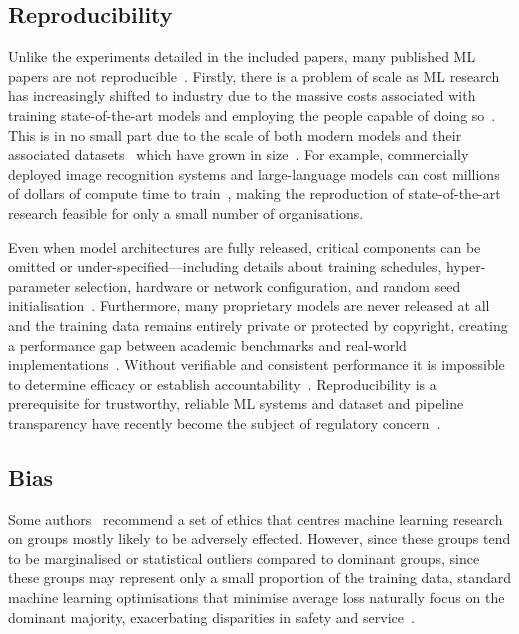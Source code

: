 \subsection{Reproducibility}
\label{subsec:reproducibility}

Unlike the experiments detailed in the included papers, many published ML papers are not reproducible~\cite{gundersen_reproducible,hutson2018reproduce,ciobanu2024reproducible,gundersen2022reproduce,medical_reproducibility}.
Firstly, there is a problem of scale as ML research has increasingly shifted to industry due to the massive costs associated with training state-of-the-art models and employing the people capable of doing so~\cite{ahmed2023growing,jurowetzki2021privatization}. 
This is in no small part due to the scale of both modern models and their associated datasets~\cite{desislavov2021compute,ai_power} which have grown in size~\cite{desislavov2021compute}.
For example, commercially deployed image recognition systems and large-language models can cost millions of dollars of compute time to train~\cite{ai_cost_comparison}, making the reproduction of state-of-the-art research feasible for only a small number of organisations. 

Even when model architectures are fully released, critical components can be omitted or under-specified---including details about training schedules, hyper-parameter selection, hardware or network configuration, and random seed initialisation~\cite{hutson2018reproduce,ciobanu2024reproducible,gundersen2022reproduce,medical_reproducibility,gundersen_reproducible}.
Furthermore, many proprietary models are never released at all and the training data remains entirely private or protected by copyright, creating a performance gap between academic benchmarks and real-world implementations~\cite{ahmed2023growing,azarpromise}. 
Without verifiable and consistent performance it is impossible to determine efficacy or establish accountability~\cite{gundersen_reproducible}.
Reproducibility is a prerequisite for trustworthy, reliable ML systems and dataset and pipeline transparency have recently become the subject of regulatory concern~\cite{ai_pipeline_regulation,ai_eu_act}. 


\subsection{Bias}
\label{subsec:bias}
Some authors~\cite{birhane2021algorithmic} recommend a set of ethics that centres machine learning research on groups mostly likely to be adversely effected. 
However, since these groups tend to be marginalised or statistical outliers compared to dominant groups, since these groups may represent only a small proportion of the training data, standard machine learning optimisations that minimise average loss naturally focus on the dominant majority, exacerbating disparities in safety and service~\cite{buolamwini2018gender}.

